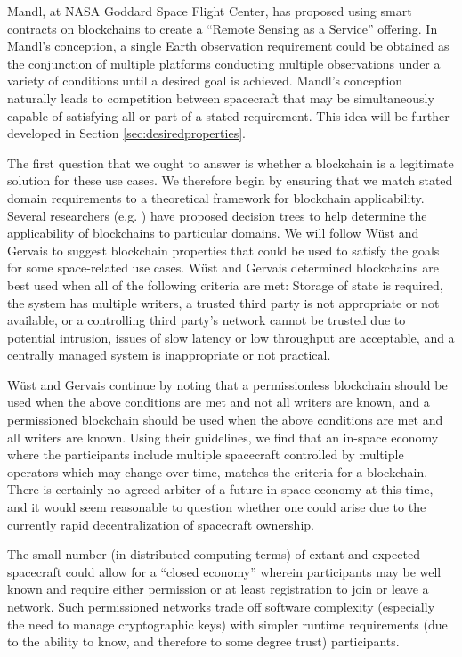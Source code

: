 \documentclass[journal ]{new-aiaa}
\begin{document}
Mandl, at NASA Goddard Space Flight Center, has proposed using smart contracts on blockchains to create a ``Remote Sensing as a Service'' offering\cite{mandl_bitcoin_2017}. In Mandl's conception, a single Earth observation requirement could be obtained as the conjunction of multiple platforms conducting multiple observations under a variety of conditions until a desired goal is achieved. Mandl's conception naturally leads to competition between spacecraft that may be simultaneously capable of satisfying all or part of a stated requirement. This idea will be further developed in Section \ref{sec:desiredproperties}.

The first question that we ought to answer is whether a blockchain is a legitimate solution for these use cases. We therefore begin by ensuring that we match stated domain requirements to a theoretical framework for blockchain applicability. Several researchers (e.g. \cite{wust_gervais_2017,xu_design_2019}) have proposed decision trees to help determine the applicability of blockchains to particular domains. We will follow W\"{u}st and Gervais\cite{wust_gervais_2017} to suggest blockchain properties that could be used to satisfy the goals for some space-related use cases. W\"{u}st and Gervais determined blockchains are best used when all of the following criteria are met: Storage of state is required, the system has multiple writers, a trusted third party is not appropriate or not available, or a controlling third party's network cannot be trusted due to potential intrusion, issues of slow latency or low throughput are acceptable, and a centrally managed system is inappropriate or not practical.

W\"{u}st and Gervais continue by noting that a permissionless blockchain should be used when the above conditions are met and not all writers are known, and a permissioned blockchain should be used when the above conditions are met and all writers are known. Using their guidelines, we find that an in-space economy where the participants include multiple spacecraft controlled by multiple operators which may change over time, matches the criteria for a blockchain. There is certainly no agreed arbiter of a future in-space economy at this time, and it would seem reasonable to question whether one could arise due to the currently rapid decentralization of spacecraft ownership.

The small number (in distributed computing terms) of extant and expected spacecraft could allow for a ``closed economy'' wherein participants may be well known and require either permission or at least registration to join or leave a network. Such permissioned networks trade off software complexity (especially the need to manage cryptographic keys) with simpler runtime requirements (due to the ability to know, and therefore to some degree trust) participants.
\end{document}
